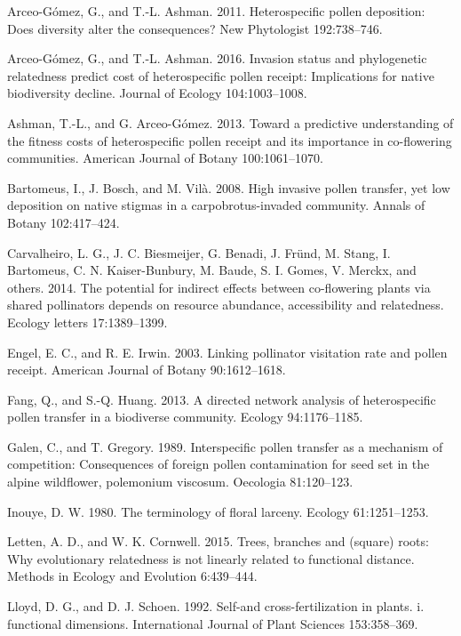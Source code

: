 \documentclass[11pt,a4paper]{article}
\begin{document}
\hypertarget{ref-arceo2011}{}
Arceo-Gómez, G., and T.-L. Ashman. 2011. Heterospecific pollen
deposition: Does diversity alter the consequences? New Phytologist
192:738--746.

\hypertarget{ref-arceo2016}{}
Arceo-Gómez, G., and T.-L. Ashman. 2016. Invasion status and
phylogenetic relatedness predict cost of heterospecific pollen receipt:
Implications for native biodiversity decline. Journal of Ecology
104:1003--1008.

\hypertarget{ref-ashman2013}{}
Ashman, T.-L., and G. Arceo-Gómez. 2013. Toward a predictive
understanding of the fitness costs of heterospecific pollen receipt and
its importance in co-flowering communities. American Journal of Botany
100:1061--1070.

\hypertarget{ref-bartomeus2008}{}
Bartomeus, I., J. Bosch, and M. Vilà. 2008. High invasive pollen
transfer, yet low deposition on native stigmas in a carpobrotus-invaded
community. Annals of Botany 102:417--424.

\hypertarget{ref-carvalheiro2014}{}
Carvalheiro, L. G., J. C. Biesmeijer, G. Benadi, J. Fründ, M. Stang, I.
Bartomeus, C. N. Kaiser-Bunbury, M. Baude, S. I. Gomes, V. Merckx, and
others. 2014. The potential for indirect effects between co-flowering
plants via shared pollinators depends on resource abundance,
accessibility and relatedness. Ecology letters 17:1389--1399.

\hypertarget{ref-engel2003}{}
Engel, E. C., and R. E. Irwin. 2003. Linking pollinator visitation rate
and pollen receipt. American Journal of Botany 90:1612--1618.

\hypertarget{ref-fang2013}{}
Fang, Q., and S.-Q. Huang. 2013. A directed network analysis of
heterospecific pollen transfer in a biodiverse community. Ecology
94:1176--1185.

\hypertarget{ref-galen1989}{}
Galen, C., and T. Gregory. 1989. Interspecific pollen transfer as a
mechanism of competition: Consequences of foreign pollen contamination
for seed set in the alpine wildflower, polemonium viscosum. Oecologia
81:120--123.

\hypertarget{ref-inouye1980}{}
Inouye, D. W. 1980. The terminology of floral larceny. Ecology
61:1251--1253.

\hypertarget{ref-letten2015}{}
Letten, A. D., and W. K. Cornwell. 2015. Trees, branches and (square)
roots: Why evolutionary relatedness is not linearly related to
functional distance. Methods in Ecology and Evolution 6:439--444.

\hypertarget{ref-lloyd1992}{}
Lloyd, D. G., and D. J. Schoen. 1992. Self-and cross-fertilization in
plants. i. functional dimensions. International Journal of Plant
Sciences 153:358--369.
\end{document}
